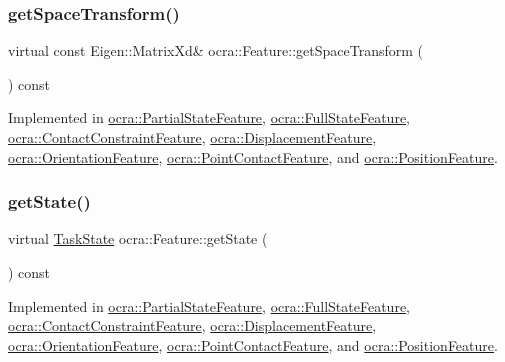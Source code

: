 \subsubsection{\texorpdfstring{get\+Space\+Transform()}{getSpaceTransform()}}
{\footnotesize\ttfamily virtual const Eigen\+::\+Matrix\+Xd\& ocra\+::\+Feature\+::get\+Space\+Transform (\begin{DoxyParamCaption}{ }\end{DoxyParamCaption}) const\hspace{0.3cm}{\ttfamily [pure virtual]}}



Implemented in \hyperlink{classocra_1_1PartialStateFeature_ac22525347f868a352d4fa2cab69a12d6}{ocra\+::\+Partial\+State\+Feature}, \hyperlink{classocra_1_1FullStateFeature_a2f6672c0d5a13df8fc4f38f011c8c32e}{ocra\+::\+Full\+State\+Feature}, \hyperlink{classocra_1_1ContactConstraintFeature_ac7f34721e72544d13e7030182b55f429}{ocra\+::\+Contact\+Constraint\+Feature}, \hyperlink{classocra_1_1DisplacementFeature_ad27f4aa83abea99ef893de6043b0bf68}{ocra\+::\+Displacement\+Feature}, \hyperlink{classocra_1_1OrientationFeature_ae820bfe2017c670eac6717fda7408c67}{ocra\+::\+Orientation\+Feature}, \hyperlink{classocra_1_1PointContactFeature_afb64d5566b4e57c7121e88799c15bac6}{ocra\+::\+Point\+Contact\+Feature}, and \hyperlink{classocra_1_1PositionFeature_a5ac98c0865a46c55d30fd7ab9738245c}{ocra\+::\+Position\+Feature}.

\hypertarget{classocra_1_1Feature_a792434ceb793f25874b8fe42ae24c475}{}\label{classocra_1_1Feature_a792434ceb793f25874b8fe42ae24c475} 
\subsubsection{\texorpdfstring{get\+State()}{getState()}}
{\footnotesize\ttfamily virtual \hyperlink{classocra_1_1TaskState}{Task\+State} ocra\+::\+Feature\+::get\+State (\begin{DoxyParamCaption}{ }\end{DoxyParamCaption}) const\hspace{0.3cm}{\ttfamily [pure virtual]}}



Implemented in \hyperlink{classocra_1_1PartialStateFeature_abb71a3727198affb3d250e6942fb6eee}{ocra\+::\+Partial\+State\+Feature}, \hyperlink{classocra_1_1FullStateFeature_aa0e23c8feabb2e6855404cd90032ffbc}{ocra\+::\+Full\+State\+Feature}, \hyperlink{classocra_1_1ContactConstraintFeature_a4a156de21fba41f54c2927232173d334}{ocra\+::\+Contact\+Constraint\+Feature}, \hyperlink{classocra_1_1DisplacementFeature_a3940d5c27ee1845c65f4be6ad3a27e50}{ocra\+::\+Displacement\+Feature}, \hyperlink{classocra_1_1OrientationFeature_a586d036d6676d9ff17d33db2dcc11cae}{ocra\+::\+Orientation\+Feature}, \hyperlink{classocra_1_1PointContactFeature_a314df3ffae28a0be71d75317e1f56ab8}{ocra\+::\+Point\+Contact\+Feature}, and \hyperlink{classocra_1_1PositionFeature_a4727a1538487e8194789bc8d38807ea0}{ocra\+::\+Position\+Feature}.

